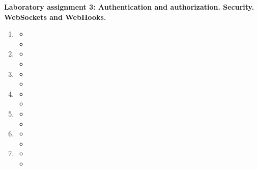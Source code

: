 
\pagebreak
\begin{center}
\textbf{Laboratory assignment 3: Authentication and authorization. Security. WebSockets and WebHooks.  }
\end{center}

\medskip

\begin{enumerate}
\item

\begin{itemize}
\item

\item
\end{itemize}



\item

\begin{itemize}
\item

\item
\end{itemize}




\item

\begin{itemize}
\item

\item
\end{itemize}




\item

\begin{itemize}
\item

\item
\end{itemize}




\item

\begin{itemize}
\item

\item
\end{itemize}



\item

\begin{itemize}
\item

\item
\end{itemize}



\item

\begin{itemize}
\item

\item
\end{itemize}

\end{enumerate}
